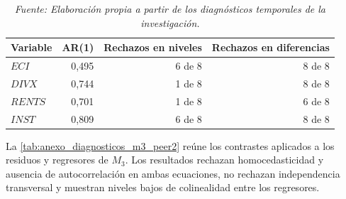 \documentclass[../../TFM.tex]{subfiles}
\begin{document}
	\begin{table}[htbp]
		\centering
		\small
		\caption{Persistencia temporal y síntesis de pruebas Fisher--ADF}
		\label{tab:anexo_persistencia_fisher_peer2}
		\begin{tabular}{lrrr}
			\toprule
			Variable & AR(1) & Rechazos en niveles & Rechazos en diferencias \\
			\midrule
			$ECI$   & 0,495 & 6 de 8 & 8 de 8 \\
			$DIVX$  & 0,744 & 1 de 8 & 8 de 8 \\
			$RENTS$ & 0,701 & 1 de 8 & 6 de 8 \\
			$INST$  & 0,809 & 6 de 8 & 8 de 8 \\
			\bottomrule
		\end{tabular}
		\caption*{\footnotesize \textit{Nota:} Los coeficientes AR(1) son descriptivos y se estiman condicionando por efectos fijos de país y año, con errores estándar agrupados por país. Las variantes Fisher--ADF combinan constante o tendencia, uno o dos rezagos y series originales o descentradas transversalmente. Fisher--ADF permite los huecos internos de este panel. Un rechazo solo indica que al menos uno de los paneles es estacionario y no permite asignar un orden de integración común.}
		\caption*{\footnotesize \textit{Fuente: Elaboración propia a partir de los diagnósticos temporales de la investigación.}}
	\end{table}

	La \autoref{tab:anexo_diagnosticos_m3_peer2} reúne los contrastes aplicados a
	los residuos y regresores de $M_3$. Los resultados rechazan homocedasticidad y
	ausencia de autocorrelación en ambas ecuaciones, no rechazan independencia
	transversal y muestran niveles bajos de colinealidad entre los regresores.
\end{document}
